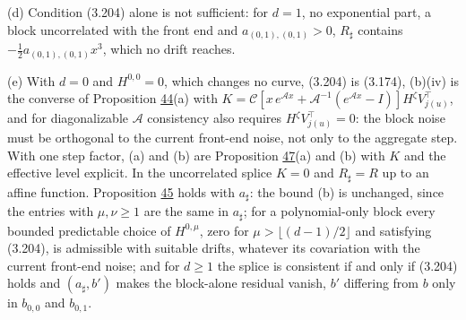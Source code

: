 \documentclass[11pt]{article}
\begin{document}
(d) Condition (3.204) alone is not sufficient: for \(d=1\), no exponential part, a block uncorrelated with the front end and \(a_{(0,1),(0,1)}>0\), \(R_\sharp\) contains \(-\frac12a_{(0,1),(0,1)}x^3\), which no drift reaches.

(e) With \(d=0\) and \(H^{0,0}=0\), which changes no curve, (3.204) is (3.174), (b)(iv) is the converse of Proposition \hyperref[res:Proposition-44]{44}(a) with \(K=\mathcal C[x\,e^{\mathcal Ax}+\mathcal A^{-1}(e^{\mathcal Ax}-I)]H^\zeta V_{j(u)}^\top\), and for diagonalizable \(\mathcal A\) consistency also requires \(H^\zeta V_{j(u)}^\top=0\): the block noise must be orthogonal to the current front-end noise, not only to the aggregate step. With one step factor, (a) and (b) are Proposition \hyperref[res:Proposition-47]{47}(a) and (b) with \(K\) and the effective level explicit. In the uncorrelated splice \(K=0\) and \(R_\sharp=R\) up to an affine function. Proposition \hyperref[res:Proposition-45]{45} holds with \(a_\sharp\): the bound (b) is unchanged, since the entries with \(\mu,\nu\ge1\) are the same in \(a_\sharp\); for a polynomial-only block every bounded predictable choice of \(H^{0,\mu}\), zero for \(\mu>\lfloor(d-1)/2\rfloor\) and satisfying (3.204), is admissible with suitable drifts, whatever its covariation with the current front-end noise; and for \(d\ge1\) the splice is consistent if and only if (3.204) holds and \((a_\sharp,b')\) makes the block-alone residual vanish, \(b'\) differing from \(b\) only in \(b_{0,0}\) and \(b_{0,1}\).
\end{document}
